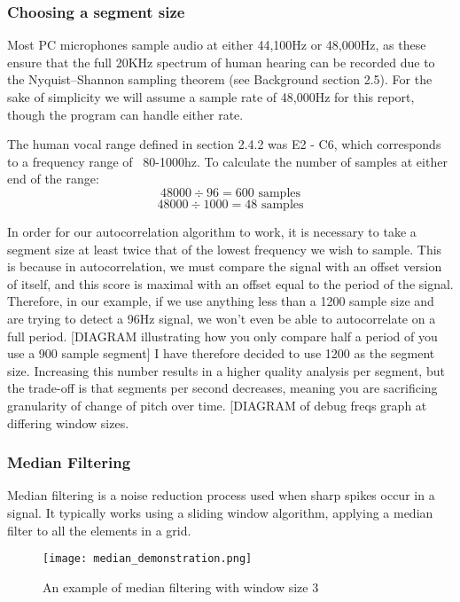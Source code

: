 \subsubsection{Choosing a segment size}
\par Most PC microphones sample audio at either 44,100Hz or 48,000Hz, as these ensure that the full 20KHz spectrum of human hearing can be recorded due to the Nyquist–Shannon sampling theorem (see Background section 2.5). For the sake of simplicity we will assume a sample rate of 48,000Hz for this report, though the program can handle either rate.
\par The human vocal range defined in section 2.4.2 was E2 - C6, which corresponds to a frequency range of ~80-1000hz\cite{scientificPitchTable}. To calculate the number of samples at either end of the range: 
 		 \[48000\div 96 = 600 \text{ samples}\] 
		 \[48000\div 1000 = 48 \text{ samples}\]
		
\par In order for our autocorrelation algorithm to work, it is  necessary to take a segment size at least twice that of the lowest frequency we wish to sample.
This is because in autocorrelation, we must compare the signal with an offset version of itself, and this score is maximal with an offset equal to the period of the signal. Therefore, in our example, if we use anything less than a 1200 sample size and are trying to detect a 96Hz signal, we won't even be able to autocorrelate on a full period. [DIAGRAM illustrating how you only compare half a period of you use a 900 sample segment] I have therefore decided to use 1200 as the segment size. Increasing this number results in a higher quality analysis per segment, but the trade-off is that segments per second decreases, meaning you are sacrificing granularity of change of pitch over time. [DIAGRAM of debug freqs graph at differing window sizes.

		
\subsubsection{Median Filtering}
Median filtering is a noise reduction process used when sharp spikes occur in a signal. It typically works using a sliding window algorithm, applying a median filter to all the elements in a grid.
\begin{figure}[h]	
	\centering	
	\texttt{[image: median\_demonstration.png]}
	\caption{An example of median filtering with window size 3}
\end{figure}



